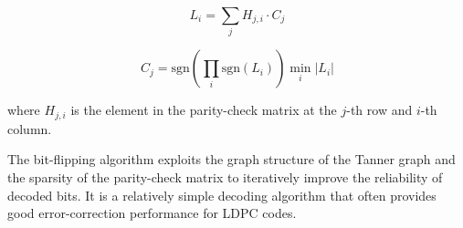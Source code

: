 \documentclass[colorlinks,11pt,a4paper,normalphoto,withhyper,ragged2e]{altareport}
\begin{document}
				\[ L_{i} = \sum_{j} H_{j,i} \cdot C_{j} \]
				
				\[ C_{j} = \text{sgn} \left( \prod_{i} \text{sgn}(L_{i}) \right) \min_{i} |L_{i}| \]
				
				where \(H_{j,i}\) is the element in the parity-check matrix at the \(j\)-th row and \(i\)-th column.
				
				The bit-flipping algorithm exploits the graph structure of the Tanner graph and the sparsity of the parity-check matrix to iteratively improve the reliability of decoded bits. It is a relatively simple decoding algorithm that often provides good error-correction performance for LDPC codes.
				
				
				
		
		
		
		
		
	
	
	
	\newpage
%	
	
\end{document}
